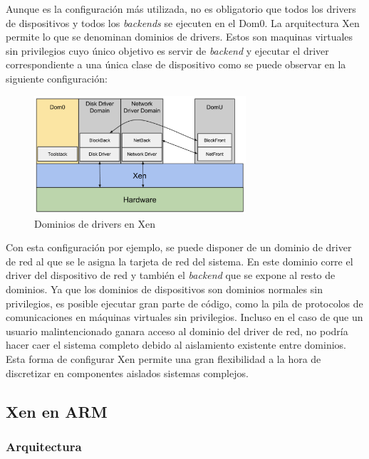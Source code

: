 Aunque es la configuración más utilizada, no es obligatorio que todos los drivers de dispositivos y todos los \textit{backends} se ejecuten en el Dom0. La arquitectura Xen permite lo que se denominan dominios de drivers. Estos son maquinas virtuales sin privilegios cuyo único objetivo es servir de \textit{backend} y ejecutar el driver correspondiente a una única clase de dispositivo como se puede observar en la siguiente configuración:\\

\begin{figure}[!h]
  \centering
  \includegraphics[width=0.70\textwidth]{recursos/xen_2.png}
  \caption{Dominios de drivers en Xen}
  \label{fig:xen_2}
\end{figure}

Con esta configuración por ejemplo, se puede disponer de un dominio de driver de red al que se le asigna la tarjeta de red del sistema. En este dominio corre el driver del dispositivo de red y también el \textit{backend} que se expone al resto de dominios. Ya que los dominios de dispositivos son dominios normales sin privilegios, es posible ejecutar gran parte de código, como la pila de protocolos de comunicaciones en máquinas virtuales sin privilegios. Incluso en el caso de que un usuario malintencionado ganara acceso al dominio del driver de red, no podría hacer caer el sistema completo debido al aislamiento existente entre dominios. Esta forma de configurar Xen permite una gran flexibilidad a la hora de discretizar en componentes aislados sistemas complejos.

\subsection{Xen en ARM}
\subsubsection{Arquitectura}

